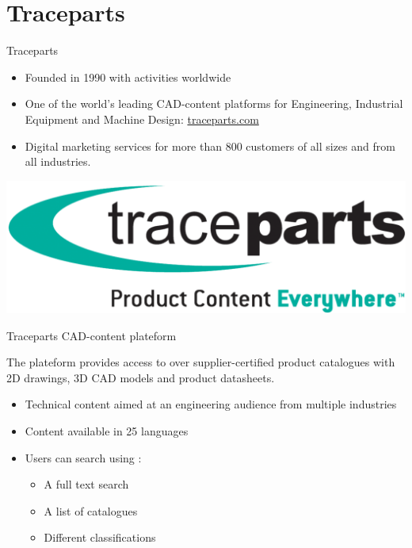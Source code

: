 \section{Traceparts}
\begin{frame}{Traceparts}

    \begin{itemize}
        \item Founded in 1990 with activities worldwide
        \item One of the world's leading CAD-content platforms for Engineering, Industrial Equipment and Machine Design: \href{http://traceparts.com/}{traceparts.com}
        \item Digital marketing services for more than 800 customers of all sizes and from all industries.
    \end{itemize}
    
    \begin{center}
        \includegraphics[scale=0.2]{images/traceparts_logo.png}
    \end{center}
    
\end{frame}

\begin{frame}{Traceparts CAD-content plateform}
    
    \begin{center}
         The plateform provides access to over supplier-certified product catalogues with 2D drawings, 3D CAD models and product datasheets.
    \end{center}

    \begin{itemize}
        \item Technical content aimed at an engineering audience from multiple industries
        \item Content available in 25 languages
        \item Users can search using :
        \begin{itemize}
            \item A full text search
            \item A list of catalogues
            \item Different classifications
        \end{itemize}
    \end{itemize}

\end{frame}

